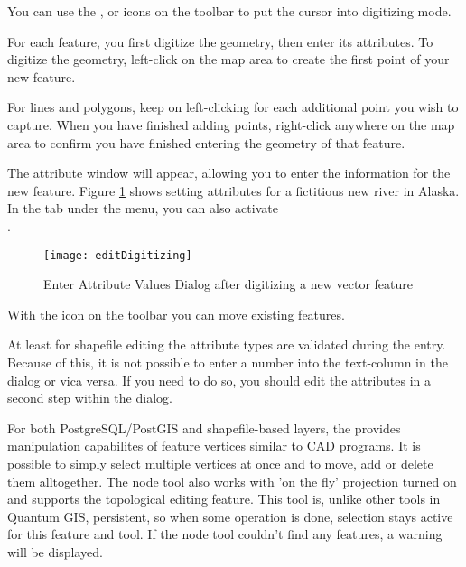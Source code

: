 
You can use the ,
 or
 icons on the toolbar to
put the \qg cursor into digitizing mode.

For each feature, you first digitize the geometry, then enter its attributes.
To digitize the geometry, left-click on the map area to create the first
point of your new feature.

For lines and polygons, keep on left-clicking for each additional
point you wish to capture.  When you have finished adding points,
right-click anywhere on the map area to confirm you have finished entering
the geometry of that feature.

The attribute window will appear, allowing you to enter the information for
the new feature. Figure \ref{fig:vector_digitising} shows setting attributes
for a fictitious new river in Alaska. In the  tab under the
 \arrow {} menu, you can also activate 
\\
.

\begin{figure}[ht]
   \centering
   \texttt{[image: editDigitizing]}
   \caption{Enter Attribute Values Dialog after digitizing a new vector feature \nixcaption}\label{fig:vector_digitising}
 \end{figure}

With the  icon on the toolbar
you can move existing features.

\begin{Tip}\caption{\textsc{Attribute Value Types}}
At least for shapefile editing the attribute types are validated during the
entry. Because of this, it is not possible to enter a number into the text-column in
the dialog  or vica versa. If you need to do so,
you should edit the attributes in a second step within the  dialog.
\end{Tip}


For both PostgreSQL/PostGIS and shapefile-based layers, the
 provides manipulation capabilites
of feature vertices similar to CAD programs. It is possible to simply select
multiple vertices at once and to move, add or delete them alltogether. The node
tool also works with 'on the fly' projection turned on and supports
the topological editing feature. This tool is, unlike other tools in Quantum GIS,
persistent, so when some operation is done, selection stays active for this
feature and tool. If the node tool couldn't find any features, a warning will be
displayed.


